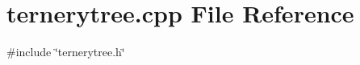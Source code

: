 \section{ternerytree.\-cpp \-File \-Reference}
\label{ternerytree_8cpp}
{\ttfamily \#include \char`\"{}ternerytree.\-h\char`\"{}}\*
